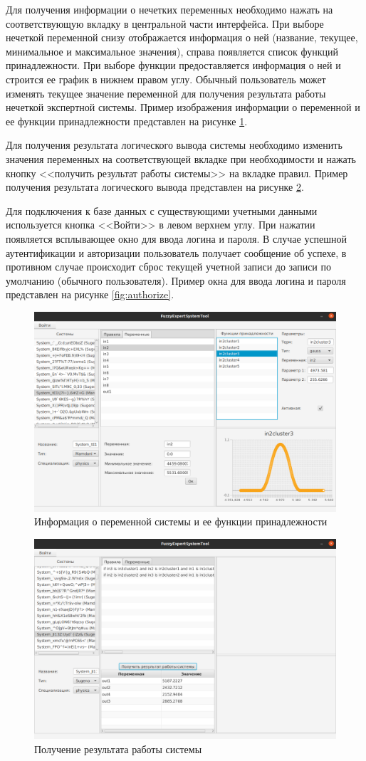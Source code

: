 Для получения информации о нечетких переменных необходимо нажать на соответствующую вкладку в центральной части интерфейса. При выборе нечеткой переменной снизу отображается информация о ней (название, текущее, минимальное и максимальное значения), справа появляется список функций принадлежности. При выборе функции предоставляется информация о ней и строится ее график в нижнем правом углу. Обычный пользователь может изменять текущее значение переменной для получения результата работы нечеткой экспертной системы. Пример изображения информации о переменной и ее функции принадлежности представлен на рисунке \ref{fig:varinfo}.

Для получения результата логического вывода системы необходимо изменить значения переменных на соответствующей вкладке при необходимости и нажать кнопку <<получить результат работы системы>> на вкладке правил. Пример получения результата логического вывода представлен на рисунке \ref{fig:output}.

Для подключения к базе данных с существующими учетными данными используется кнопка <<Войти>> в левом верхнем углу. При нажатии появляется всплывающее окно для ввода логина и пароля. В случае успешной аутентификации и авторизации пользователь получает сообщение об успехе, в противном случае происходит сброс текущей учетной записи до записи по умолчанию (обычного пользователя). Пример окна для ввода логина и пароля представлен на рисунке \ref{fig:authorize}.

\begin{figure}[H]
	\centering
	\includegraphics[width=0.7\linewidth]{img/varInfo}
	\caption{Информация о переменной системы и ее функции принадлежности}
	\label{fig:varinfo}
\end{figure}
\begin{figure}[H]
	\centering
	\includegraphics[width=0.7\linewidth]{img/output}
	\caption{Получение результата работы системы}
	\label{fig:output}
\end{figure}

